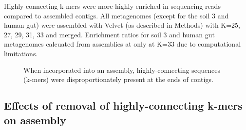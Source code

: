 \documentclass[11pt]{article} %
\begin{document}
\begin{table}
\caption{Highly-connecting k-mers were more highly enriched in sequencing reads compared to assembled contigs.  All metagenomes (except for the soil 3 and human gut) were assembled with Velvet (as described in Methods) with K=25, 27, 29, 31, 33 and merged.  Enrichment ratios for soil 3 and human gut metagenomes calcuated from assemblies at only at K=33 due to computational limitations.}
\end{table}

\begin{figure}
\caption{When incorporated into an assembly, highly-connecting sequences (k-mers) were disproportionately present at the ends of contigs.}
\end{figure}

\subsection{Effects of removal of highly-connecting k-mers on assembly}
\end{document}
